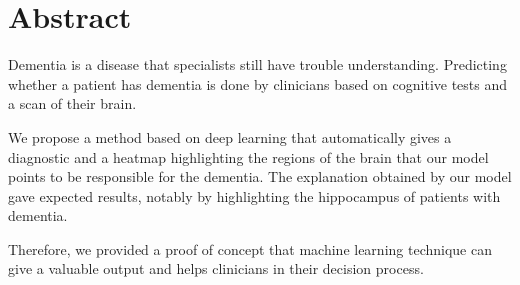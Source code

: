 \chapter{Abstract}
Dementia is a disease that specialists still have trouble understanding. Predicting whether a patient has dementia is done by clinicians based on cognitive tests and a scan of their brain. 

We propose a method based on deep learning that automatically gives a diagnostic and a heatmap highlighting the regions of the brain that our model points to be responsible for the dementia. The explanation obtained by our model gave expected results, notably by highlighting the hippocampus of patients with dementia.  

Therefore, we provided a proof of concept that machine learning technique can give a valuable output and helps clinicians in their decision process.